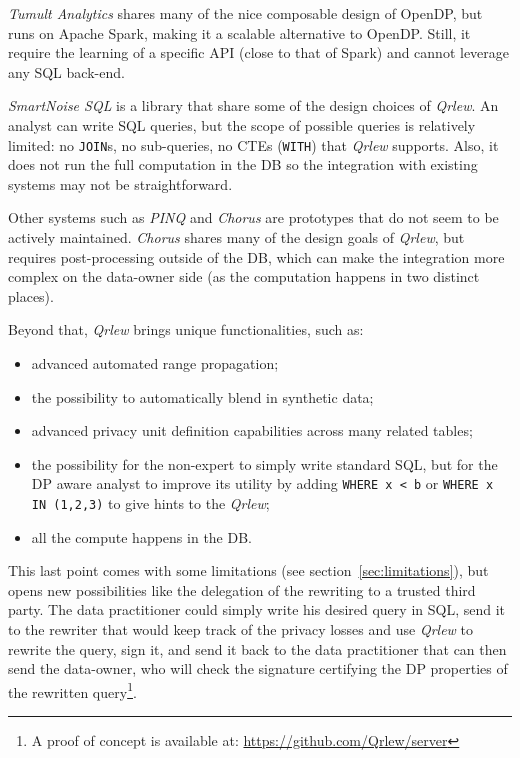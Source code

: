 \documentclass[letterpaper]{article} %
\newcommand{\qrlew}{\emph{Qrlew}}
\begin{document}
\emph{Tumult Analytics} \cite{berghel2022tumult} shares many of the nice composable design of OpenDP, but runs on Apache Spark, making it a scalable alternative to OpenDP. Still, it require the learning of a specific API (close to that of Spark) and cannot leverage any SQL back-end.

\emph{SmartNoise SQL} is a library that share some of the design choices of \qrlew{}. An analyst can write SQL queries, but the scope of possible queries is relatively limited: no \texttt{JOIN}s, no sub-queries, no CTEs (\texttt{WITH}) that \qrlew{} supports. Also, it does not run the full computation in the DB so the integration with existing systems may not be straightforward.

Other systems such as \emph{PINQ} \cite{mcsherry2009privacy} and \emph{Chorus} \cite{johnson2020chorus} are prototypes that do not seem to be actively maintained. \emph{Chorus} shares many of the design goals of \qrlew{}, but requires post-processing outside of the DB, which can make the integration more complex on the data-owner side (as the computation happens in two distinct places).

Beyond that, \qrlew{} brings unique functionalities, such as:
\begin{itemize}
    \item advanced automated range propagation;
    \item the possibility to automatically blend in synthetic data;
    \item advanced privacy unit definition capabilities across many related tables;
    \item the possibility for the non-expert to simply write standard SQL, but for the DP aware analyst to improve its utility by adding \texttt{WHERE x < b} or \texttt{WHERE x IN (1,2,3)} to give hints to the \qrlew{};
    \item all the compute happens in the DB.
\end{itemize}

This last point comes with some limitations (see section~\ref{sec:limitations}), but opens new possibilities like the delegation of the rewriting to a trusted third party. The data practitioner could simply write his desired query in SQL, send it to the rewriter that would keep track of the privacy losses and use \qrlew{} to rewrite the query, sign it, and send it back to the data practitioner that can then send the data-owner, who will check the signature certifying the DP properties of the rewritten query\footnote{A proof of concept is available at: \url{https://github.com/Qrlew/server}}.
\end{document}
